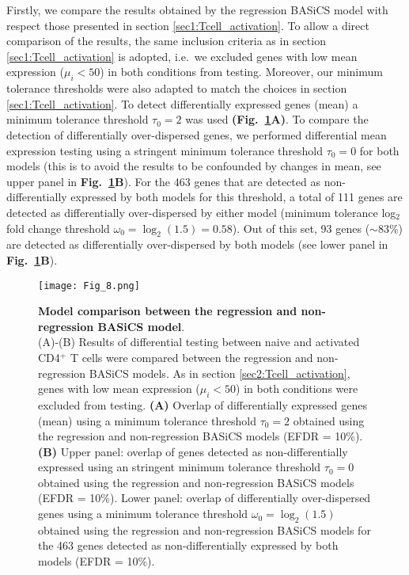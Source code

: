 Firstly, we compare the results obtained by the regression BASiCS model with respect those presented in section \ref{sec1:Tcell_activation}.  
To allow a direct comparison of the results, the same inclusion criteria as in section \ref{sec1:Tcell_activation} is adopted, i.e.~we excluded genes with low mean expression ($\mu_i<50$) in both conditions from testing. Moreover, our  minimum tolerance thresholds were also adapted to match the choices in section \ref{sec1:Tcell_activation}. To detect differentially expressed genes (mean) a minimum tolerance threshold $\tau_0 = 2$ was used \textbf{(Fig.~\ref{fig2:model_comparison}A)}. To compare the detection of differentially over-dispersed genes, we performed differential mean expression testing using a stringent minimum tolerance threshold $\tau_0 = 0$ for both models (this is to avoid the results to be confounded by changes in mean, see upper panel in \textbf{Fig.~\ref{fig2:model_comparison}B}). For the 463 genes that are detected as non-differentially expressed by both models for this threshold, a total of 111 genes are detected as differentially over-dispersed by either model (minimum tolerance log$_2$ fold change threshold $\omega_0 = \log_2(1.5) = 0.58$). Out of this set, 93 genes ($\sim$83\%) are detected as differentially over-dispersed by both models (see lower panel in \textbf{Fig.~\ref{fig2:model_comparison}B}). \\

\begin{figure}[!h]
\centering
\texttt{[image: Fig\_8.png]}
\caption{\textbf{Model comparison between the regression and non-regression BASiCS model}.\\
(A)-(B) Results of differential testing between naive and activated CD4$^+$ T cells were compared between the regression and non-regression BASiCS models. As in section \ref{sec2:Tcell_activation}, genes with low mean expression ($\mu_i<50$) in both conditions were excluded from testing. \textbf{(A)} Overlap of differentially expressed genes (mean) using a minimum tolerance threshold $
\tau_0=2$ obtained using the regression and non-regression BASiCS models (EFDR = 10\%).\textbf{(B)} Upper panel: overlap of genes detected as non-differentially expressed using an stringent minimum tolerance threshold $\tau_0=0$ obtained using the regression and non-regression BASiCS models (EFDR = 10\%). Lower panel: overlap of differentially over-dispersed genes using a minimum tolerance threshold $\omega_0=\log_2(1.5)$ obtained using the regression and non-regression  BASiCS models for the 463 genes detected as non-differentially expressed by both models (EFDR = 10\%).\\}
\label{fig2:model_comparison}
\end{figure}

